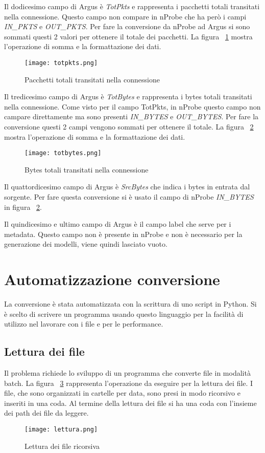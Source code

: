 \documentclass[../main.tex]{subfiles}
\begin{document}
Il dodicesimo campo di Argus è \textit{TotPkts} e rappresenta i pacchetti totali transitati nella connessione. Questo campo non compare in nProbe che ha però i campi \textit{IN\_PKTS} e \textit{OUT\_PKTS}. Per fare la conversione da nProbe ad Argus si sono sommati questi 2 valori per ottenere il totale dei pacchetti. La figura ~\ref{fig:totpkts} mostra l'operazione di somma e la formattazione dei dati.
\begin{figure}[H]
				\centering
\texttt{[image: totpkts.png]}
				\caption{Pacchetti totali transitati nella connessione}
				\label{fig:totpkts}
\end{figure}

Il tredicesimo campo di Argus è \textit{TotBytes} e rappresenta i bytes totali transitati nella connessione. Come visto per il campo TotPkts, in nProbe questo campo non campare direttamente ma sono presenti \textit{IN\_BYTES} e \textit{OUT\_BYTES}. Per fare la conversione questi 2 campi vengono sommati per ottenere il totale. La figura ~\ref{fig:totbytes} mostra l'operazione di somma e la formattazione dei dati.
\begin{figure}[H]
				\centering
\texttt{[image: totbytes.png]}
				\caption{Bytes totali transitati nella connessione}
				\label{fig:totbytes}
\end{figure}

Il quattordicesimo campo di Argus è \textit{SrcBytes} che indica i bytes in entrata dal sorgente. Per fare questa conversione si è usato il campo di nProbe \textit{IN\_BYTES} in figura ~\ref{fig:totbytes}.

Il quindicesimo e ultimo campo di Argus è il campo label che serve per i metadata. Questo campo non è presente in nProbe e non è necessario per la generazione dei modelli, viene quindi lasciato vuoto.



\section{Automatizzazione conversione}
La conversione è stata automatizzata con la scrittura di uno script in Python. Si è scelto di scrivere un programma usando questo linguaggio per la facilità di utilizzo nel lavorare con i file e per le performance.

\subsection{Lettura dei file}\label{letturafilesec}
Il problema richiede lo sviluppo di un programma che converte file in modalità batch.
La figura ~\ref{fig:lettura} rappresenta l'operazione da eseguire per la lettura dei file. I file, che sono organizzati in cartelle per data, sono presi in modo ricorsivo e inseriti in una coda. Al termine della lettura dei file si ha una coda con l'insieme dei path dei file da leggere.
\begin{figure}[H]
				\centering
\texttt{[image: lettura.png]}
				\caption{Lettura dei file ricorsiva}
				\label{fig:lettura}
\end{figure}
\end{document}
